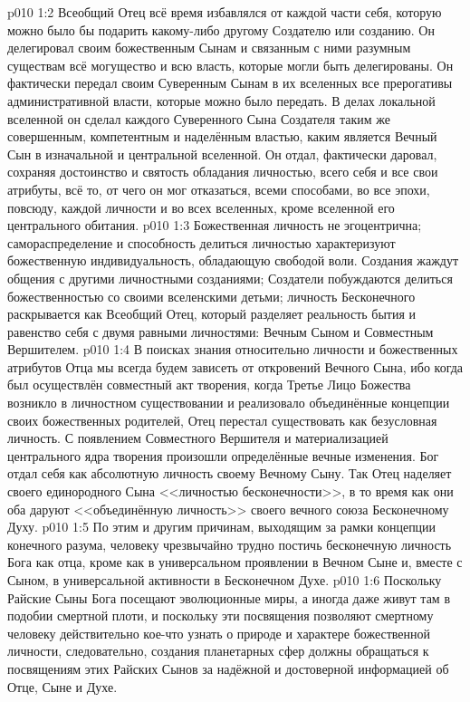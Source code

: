 \vs p010 1:2 Всеобщий Отец всё время избавлялся от каждой части себя, которую можно было бы подарить какому\hyp{}либо другому Создателю или созданию. Он делегировал своим божественным Сынам и связанным с ними разумным существам всё могущество и всю власть, которые могли быть делегированы. Он фактически передал своим Суверенным Сынам в их вселенных все прерогативы административной власти, которые можно было передать. В делах локальной вселенной он сделал каждого Суверенного Сына Создателя таким же совершенным, компетентным и наделённым властью, каким является Вечный Сын в изначальной и центральной вселенной. Он отдал, фактически даровал, сохраняя достоинство и святость обладания личностью, всего себя и все свои атрибуты, всё то, от чего он мог отказаться, всеми способами, во все эпохи, повсюду, каждой личности и во всех вселенных, кроме вселенной его центрального обитания.
\vs p010 1:3 \pc Божественная личность не эгоцентрична; самораспределение и способность делиться личностью характеризуют божественную индивидуальность, обладающую свободой воли. Создания жаждут общения с другими личностными созданиями; Создатели побуждаются делиться божественностью со своими вселенскими детьми; личность Бесконечного раскрывается как Всеобщий Отец, который разделяет реальность бытия и равенство себя с двумя равными личностями: Вечным Сыном и Совместным Вершителем.
\vs p010 1:4 \pc В поисках знания относительно личности и божественных атрибутов Отца мы всегда будем зависеть от откровений Вечного Сына, ибо когда был осуществлён совместный акт творения, когда Третье Лицо Божества возникло в личностном существовании и реализовало объединённые концепции своих божественных родителей, Отец перестал существовать как безусловная личность. С появлением Совместного Вершителя и материализацией центрального ядра творения произошли определённые вечные изменения. Бог отдал себя как абсолютную личность своему Вечному Сыну. Так Отец наделяет своего единородного Сына <<личностью бесконечности>>, в то время как они оба даруют <<объединённую личность>> своего вечного союза Бесконечному Духу.
\vs p010 1:5 По этим и другим причинам, выходящим за рамки концепции конечного разума, человеку чрезвычайно трудно постичь бесконечную личность Бога как отца, кроме как в универсальном проявлении в Вечном Сыне и, вместе с Сыном, в универсальной активности в Бесконечном Духе.
\vs p010 1:6 Поскольку Райские Сыны Бога посещают эволюционные миры, а иногда даже живут там в подобии смертной плоти, и поскольку эти посвящения позволяют смертному человеку действительно кое\hyp{}что узнать о природе и характере божественной личности, следовательно, создания планетарных сфер должны обращаться к посвящениям этих Райских Сынов за надёжной и достоверной информацией об Отце, Сыне и Духе.
